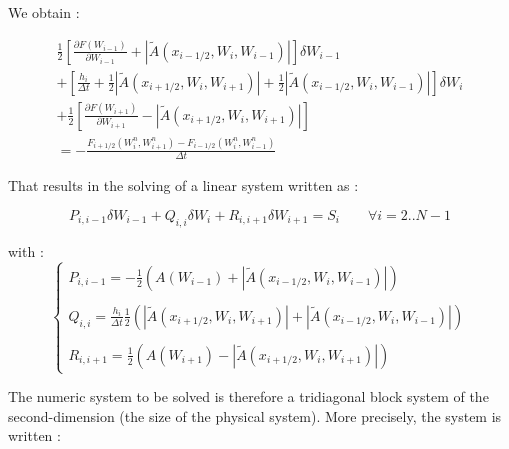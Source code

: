 \vspace{0.5cm}

We obtain :

\begin{eqnarray}
 & \frac{1}{2} \left [ \frac{\partial F(W_{i-1})}{\partial W_{i-1}} + |\tilde{A}(x_{i-1/2},W_i,W_{i-1})| \right ]\delta W_{i-1} & \nonumber \\
& + \left [ \frac{h_i}{\Delta t} + \frac{1}{2}|\tilde{A}(x_{i+1/2},W_i,W_{i+1})| +  \frac{1}{2} |\tilde{A}(x_{i-1/2},W_i,W_{i-1})| \right ] \delta W_i & \nonumber \\
& + \frac{1}{2} \left [ \frac{\partial F(W_{i+1})}{\partial W_{i+1}} - |\tilde{A}(x_{i+1/2},W_i,W_{i+1})| \right ] & \nonumber \\
& = - \frac{F_{i+1/2}(W_{i}^n,W_{i+1}^n) - F_{i-1/2}(W_{i}^n,W_{i-1}^n)}{\Delta t}
\end{eqnarray}

\vspace{0.5cm}

That results in the solving of a linear system written as :

\begin{equation}
 P_{i,i-1}\delta W_{i-1} + Q_{i,i} \delta W_i + R_{i,i+1} \delta W_{i+1} = S_i \qquad \forall i=2..N-1
\end{equation}

with :
\begin{equation}
\left \lbrace
  \begin{array}{l}
   P_{i,i-1} = - \frac{1}{2} (A(W_{i-1}) +|\tilde{A}(x_{i-1/2},W_i,W_{i-1})| ) \\
   \\
   Q_{i,i} = \frac{h_i}{\Delta t} \frac{1}{2}(|\tilde{A}(x_{i+1/2},W_i,W_{i+1})| + |\tilde{A}(x_{i-1/2},W_i,W_{i-1})|)\\
   \\
   R_{i,i+1} = \frac{1}{2} (A(W_{i+1}) -|\tilde{A}(x_{i+1/2},W_i,W_{i+1})|)
\end{array}
 \right.
\end{equation}

\vspace{0.5cm}

The numeric system to be solved is therefore a tridiagonal block system of the second-dimension (the size of the physical system). More precisely, the system is written :

